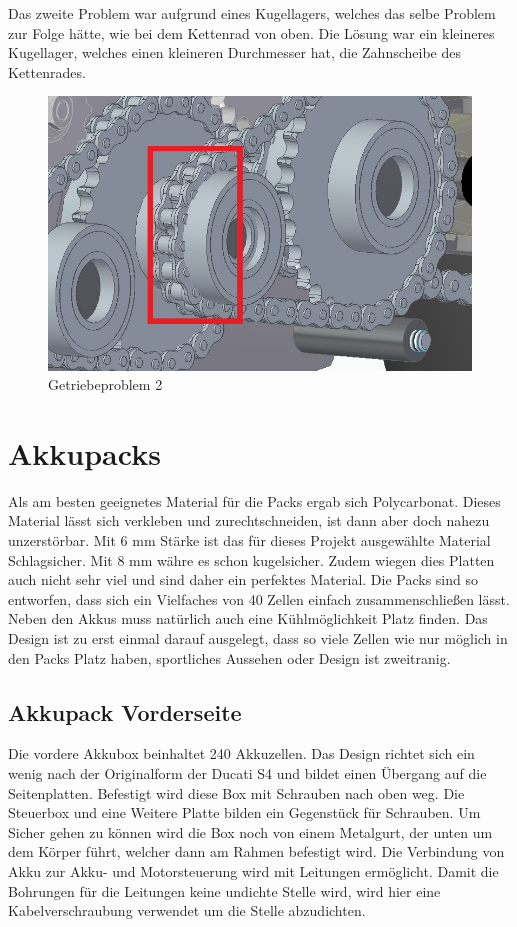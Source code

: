 Das zweite Problem war aufgrund eines Kugellagers, welches das selbe Problem zur Folge hätte, wie bei dem Kettenrad von oben. Die Lösung war ein kleineres Kugellager, welches einen kleineren Durchmesser hat, die Zahnscheibe des Kettenrades.

\begin{figure} [H]
	\begin{center}
		\includegraphics[scale=0.5]{figures/mechanik/Getriebeproblem1.jpg}
			\caption{Getriebeproblem 2}
			\label{fig:Getriebeproblem 2}
	\end{center}
\end{figure}

\newpage

\section{Akkupacks} \label{Akkupacks}
Als am besten geeignetes Material für die Packs ergab sich Polycarbonat. Dieses Material lässt sich verkleben und zurechtschneiden, ist dann aber doch nahezu unzerstörbar. Mit 6 mm Stärke ist das für dieses Projekt ausgewählte Material Schlagsicher. Mit 8 mm währe es schon kugelsicher. Zudem wiegen dies Platten auch nicht sehr viel und sind daher ein perfektes Material.
Die Packs sind so entworfen, dass sich ein Vielfaches von 40 Zellen einfach zusammenschließen lässt. Neben den Akkus muss natürlich auch eine Kühlmöglichkeit Platz finden. Das Design ist zu erst einmal darauf ausgelegt, dass so viele Zellen wie nur möglich in den Packs Platz haben, sportliches Aussehen oder Design ist zweitranig.

\subsection{Akkupack Vorderseite}
Die vordere Akkubox beinhaltet 240 Akkuzellen. Das Design richtet sich ein wenig nach der Originalform der Ducati S4 und bildet einen Übergang auf die Seitenplatten. Befestigt wird diese Box mit Schrauben nach oben weg. Die Steuerbox und eine Weitere Platte bilden ein Gegenstück für Schrauben. Um Sicher gehen zu können wird die Box noch von einem Metalgurt, der unten um dem Körper führt, welcher dann am Rahmen befestigt wird. Die Verbindung von Akku zur Akku- und Motorsteuerung wird mit Leitungen ermöglicht. Damit die Bohrungen für die Leitungen keine undichte Stelle wird, wird hier eine Kabelverschraubung verwendet um die Stelle abzudichten.


